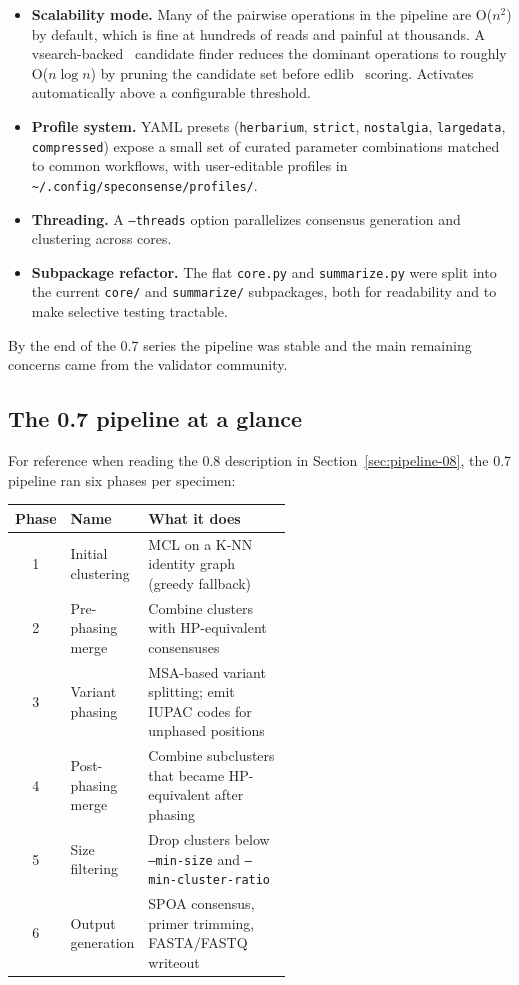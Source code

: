 \documentclass[11pt]{article}
\begin{document}
\begin{itemize}
  \item \textbf{Scalability mode.} Many of the pairwise operations in the
  pipeline are O($n^2$) by default, which is fine at hundreds of reads and
  painful at thousands. A vsearch-backed~\cite{vsearch} candidate finder
  reduces the dominant operations to roughly O($n \log n$) by pruning the
  candidate set before edlib~\cite{edlib} scoring. Activates automatically
  above a configurable threshold.
  \item \textbf{Profile system.} YAML presets (\texttt{herbarium},
  \texttt{strict}, \texttt{nostalgia}, \texttt{largedata}, \texttt{compressed})
  expose a small set of curated parameter combinations matched to common
  workflows, with user-editable profiles in
  \texttt{\textasciitilde/.config/speconsense/profiles/}.
  \item \textbf{Threading.} A \texttt{--threads} option parallelizes consensus
  generation and clustering across cores.
  \item \textbf{Subpackage refactor.} The flat \texttt{core.py} and
  \texttt{summarize.py} were split into the current \texttt{core/} and
  \texttt{summarize/} subpackages, both for readability and to make selective
  testing tractable.
\end{itemize}

By the end of the 0.7 series the pipeline was stable and the main remaining
concerns came from the validator community.

\subsection{The 0.7 pipeline at a glance}

For reference when reading the 0.8 description in
Section~\ref{sec:pipeline-08}, the 0.7 pipeline ran six phases per specimen:

\begin{center}
\begin{tabular}{cl p{0.55\linewidth}}
\toprule
Phase & Name & What it does \\
\midrule
1 & Initial clustering & MCL on a K-NN identity graph (greedy fallback) \\
2 & Pre-phasing merge & Combine clusters with HP-equivalent consensuses \\
3 & Variant phasing & MSA-based variant splitting; emit IUPAC codes for unphased positions \\
4 & Post-phasing merge & Combine subclusters that became HP-equivalent after phasing \\
5 & Size filtering & Drop clusters below \texttt{--min-size} and \texttt{--min-cluster-ratio} \\
6 & Output generation & SPOA consensus, primer trimming, FASTA/FASTQ writeout \\
\bottomrule
\end{tabular}
\end{center}
\end{document}
